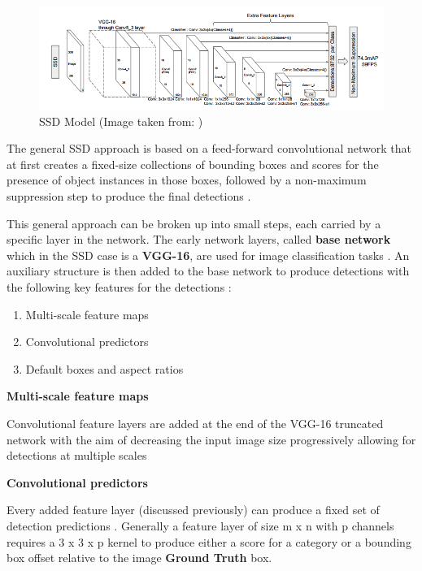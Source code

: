 \begin{figure}[!htbp]
\begin{center}
\includegraphics[width=\linewidth]{images/ssd_architecture.png}
\end{center}
\caption{SSD Model (Image taken from: \cite{paper:SSD})}
\label{fig:sshModel}
\end{figure}

The general SSD approach is based on a feed-forward convolutional network that at first creates a fixed-size collections of bounding boxes and scores for the presence of object instances in those boxes, followed by a non-maximum suppression step to produce the final detections \cite{paper:SSD}.

This general approach can be broken up  into small steps, each carried by a specific layer in the network. The early network layers, called \textbf{base network} which in the SSD case is a \textbf{VGG-16}, are used for image classification tasks \cite{paper:SSD}. An auxiliary structure is then added to the base network to produce detections with the following key features for the detections \cite{paper:SSD}:

\begin{enumerate}
  \item Multi-scale feature maps
  \item Convolutional predictors
  \item Default boxes and aspect ratios
\end{enumerate}

\textbf{Multi-scale feature maps}

Convolutional feature layers are added at the end of the VGG-16 truncated network with the aim of decreasing the input image size progressively allowing for detections at multiple scales \cite{paper:SSD}

\textbf{Convolutional predictors}

Every added feature layer (discussed previously) can produce a fixed set of detection predictions \cite{paper:SSD}. Generally a feature layer of size m x n with p channels requires a 3 x 3 x p kernel to produce either a score for a category or a bounding box offset relative to the image \textbf{Ground Truth} box.

